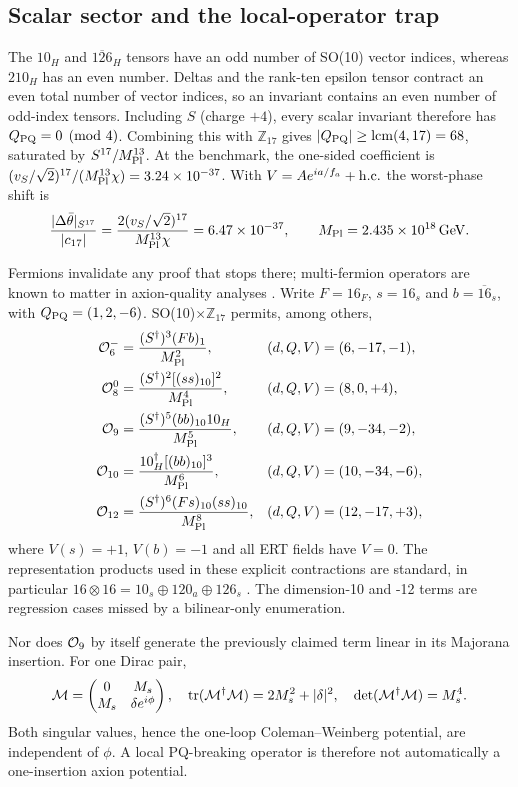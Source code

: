 \documentclass[11pt,a4paper]{article}
\newcommand{\GeV}{\,\mathrm{GeV}}
\newcommand{\Zs}{\mathbb{Z}_{17}}
\begin{document}
\subsection*{Scalar sector and the local-operator trap}
The $10_H$ and $\overline{126}_H$ tensors have an odd number of SO(10)
vector indices, whereas $210_H$ has an even number. Deltas and the
rank-ten epsilon tensor contract an even total number of vector indices,
so an invariant contains an even number of odd-index tensors. Including
$S$ (charge $+4$), every scalar invariant therefore has
$Q_{\rm PQ}=0\pmod4$. Combining this with $\Zs$ gives
$|Q_{\rm PQ}|\geq\mathop{\rm lcm}(4,17)=68$, saturated by
$S^{17}/M_{\rm Pl}^{13}$. At the benchmark, the one-sided coefficient is
$(v_S/\sqrt2)^{17}/(M_{\rm Pl}^{13}\chi)=3.24\times10^{-37}$.
With $V=A e^{ia/f_a}+{\rm h.c.}$ the worst-phase shift is
\begin{equation}
 \frac{|\Delta\bar\theta|_{S^{17}}}{|c_{17}|}
 = \frac{2(v_S/\sqrt2)^{17}}{M_{\rm Pl}^{13}\chi}
 =6.47\times10^{-37},
 \qquad M_{\rm Pl}=2.435\times10^{18}\GeV .
\label{eq:scalarquality}
\end{equation}

Fermions invalidate any proof that stops there; multi-fermion operators
are known to matter in axion-quality analyses \cite{BDMquality}. Write
$F=16_F$, $s=16_s$ and $b=\overline{16}_s$, with
$Q_{\rm PQ}=(1,2,-6)$. SO(10)$\times\Zs$ permits, among others,
\begin{align}
{\cal O}_6^-&=\frac{(S^\dagger)^3(Fb)_1}{M_{\rm Pl}^{2}},
 &(d,Q,V)&=(6,-17,-1),\nonumber\\
{\cal O}_8^0&=\frac{(S^\dagger)^2[(ss)_{10}]^2}{M_{\rm Pl}^{4}},
 &(d,Q,V)&=(8,0,+4),\nonumber\\
{\cal O}_9&=\frac{(S^\dagger)^5(bb)_{10}10_H}{M_{\rm Pl}^{5}},
 &(d,Q,V)&=(9,-34,-2),\nonumber\\
{\cal O}_{10}&=\frac{10_H^\dagger[(bb)_{10}]^3}{M_{\rm Pl}^{6}},
 &(d,Q,V)&=(10,-34,-6),\nonumber\\
{\cal O}_{12}&=\frac{(S^\dagger)^6(Fs)_{10}(ss)_{10}}
 {M_{\rm Pl}^{8}},
 &(d,Q,V)&=(12,-17,+3),
\label{eq:operators}
\end{align}
where $V(s)=+1$, $V(b)=-1$ and all ERT fields have $V=0$.
The representation products used in these explicit contractions are
standard, in particular $16\otimes16=10_s\oplus120_a\oplus126_s$
\cite{Djouadi}. The dimension-10 and -12 terms are regression cases
missed by a bilinear-only enumeration.

Nor does ${\cal O}_9$ by itself generate the previously claimed term
linear in its Majorana insertion. For one Dirac pair,
\begin{equation}
 {\cal M}=\begin{pmatrix}0&M_s\\M_s&\delta e^{i\phi}\end{pmatrix},
 \quad {\rm tr}({\cal M}^\dagger{\cal M})=2M_s^2+|\delta|^2,
 \quad \det({\cal M}^\dagger{\cal M})=M_s^4 .
\label{eq:massmatrix}
\end{equation}
Both singular values, hence the one-loop Coleman--Weinberg potential,
are independent of $\phi$. A local PQ-breaking operator is therefore
not automatically a one-insertion axion potential.
\end{document}
